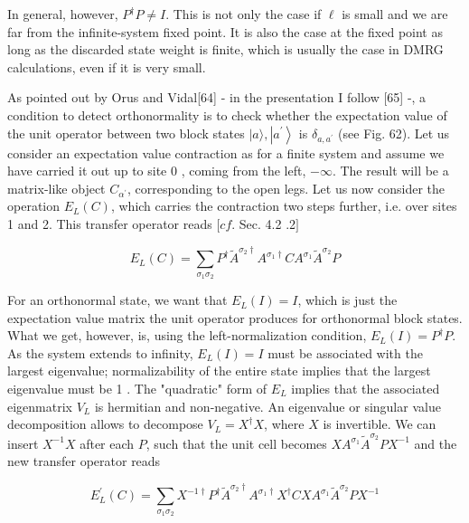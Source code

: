 \documentclass[12pt]{article}
\begin{document}
In general, however, $P^{\dagger} P \neq I$. This is not only the case if $\ell$ is small and we are far from the infinite-system fixed point. It is also the case at the fixed point as long as the discarded state weight is finite, which is usually the case in DMRG calculations, even if it is very small.

As pointed out by Orus and Vidal[64] - in the presentation I follow [65] -, a condition to detect orthonormality is to check whether the expectation value of the unit operator between two block states $|a\rangle,\left|a^{\prime}\right\rangle$ is $\delta_{a, a^{\prime}}$ (see Fig. 62). Let us consider an expectation value contraction as for a finite system and assume we have carried it out up to site 0 , coming from the left, $-\infty$. The result will be a matrix-like object $C_{\alpha^{\prime}}$, corresponding to the open legs. Let us now consider the operation $E_{L}(C)$, which carries the contraction two steps further, i.e. over sites 1 and 2. This transfer operator reads $[c f$. Sec. 4.2 .2$]$


\begin{equation*}
E_{L}(C)=\sum_{\sigma_{1} \sigma_{2}} P^{\dagger} \tilde{A}^{\sigma_{2} \dagger} A^{\sigma_{1} \dagger} C A^{\sigma_{1}} \tilde{A}^{\sigma_{2}} P \tag{353}
\end{equation*}


For an orthonormal state, we want that $E_{L}(I)=I$, which is just the expectation value matrix the unit operator produces for orthonormal block states. What we get, however, is, using the left-normalization condition, $E_{L}(I)=P^{\dagger} P$. As the system extends to infinity, $E_{L}(I)=I$ must be associated with the largest eigenvalue; normalizability of the entire state implies that the largest eigenvalue must be 1 . The "quadratic" form of $E_{L}$ implies that the associated eigenmatrix $V_{L}$ is hermitian and non-negative. An eigenvalue or singular value decomposition allows to decompose $V_{L}=X^{\dagger} X$, where $X$ is invertible. We can insert $X^{-1} X$ after each $P$, such that the unit cell becomes $X A^{\sigma_{1}} \tilde{A}^{\sigma_{2}} P X^{-1}$ and the new transfer operator reads


\begin{equation*}
E_{L}^{\prime}(C)=\sum_{\sigma_{1} \sigma_{2}} X^{-1 \dagger} P^{\dagger} \tilde{A}^{\sigma_{2} \dagger} A^{\sigma_{1} \dagger} X^{\dagger} C X A^{\sigma_{1}} \tilde{A}^{\sigma_{2}} P X^{-1} \tag{354}
\end{equation*}
\end{document}
